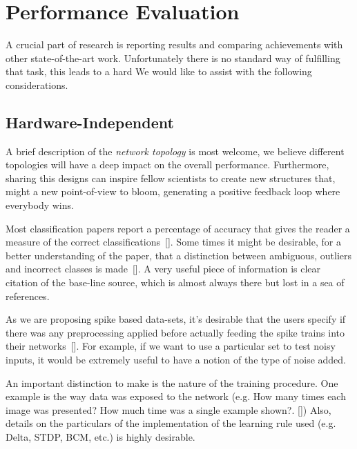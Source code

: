 \section{Performance Evaluation}
\label{sec:eval}

A crucial part of research is reporting results and comparing achievements with other state-of-the-art work. Unfortunately there is no standard way of fulfilling that task, this leads to a hard 
We would like to assist with the following considerations.


\subsection{Hardware-Independent}
A brief description of the \emph{network topology} is most welcome, we believe different topologies will have a deep impact on the overall performance. Furthermore, sharing this designs can inspire fellow scientists to create new structures that, might  a new point-of-view to bloom, generating a positive feedback loop where everybody wins.

Most classification papers report a percentage of accuracy that gives the reader a measure of the correct classifications~[\cite{dietterich1998approximate}]. Some times it might be desirable, for a better understanding of the paper, that a distinction between ambiguous, outliers and incorrect classes is made~[\cite{liu2002performance}]. A very useful piece of information is clear citation of the base-line source, which is almost always there but lost in a sea of references.


As we are proposing spike based data-sets, it's desirable that the users specify if there was any preprocessing applied before actually feeding the spike trains into their networks~[\cite{best-practice-nn-img}]. For example, if we want to use a particular set to test noisy inputs, it would be extremely useful to have a notion of the type of noise added.


An important distinction to make is the nature of the training procedure. One example is the way data was exposed to the network (e.g. How many times each image was presented? How much time was a single example shown?. [\cite{Diehl2015unsupervised}]) Also, details on the particulars of the implementation of the learning rule used (e.g. Delta, STDP, BCM, etc.) is highly desirable. 

